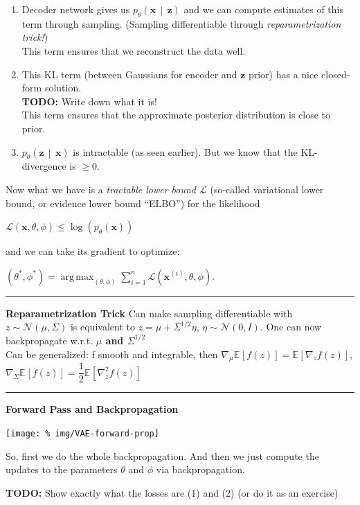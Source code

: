 \documentclass[a2paper,8pt]{extarticle}
\newcommand{\tcb}[1]{\textcolor{lighttext}{#1}}
\newcommand{\tcb}[1]{\textcolor{blue}{#1}}
\newcommand{\cL}{\mathcal{L}}
\newcommand{\cDist}[3]{#1\left( #2 \,\middle|\, #3 \right)}
\newcommand{\Exp}[2][]{{\mathbb{E}_{#1}}\left[ #2
\right]}
\DeclareMathOperator*{\argmax}{arg\,max}
\renewcommand{\vec}[1]{\mathbf{#1}}
\newcommand{\vx}{\vec{x}}
\newcommand{\vz}{\vec{z}}
\newcommand{\todo}[1]{\textbf{TODO:} #1}
\newcommand{\todo}[1]{%
}
\newcommand{\sep}{\vspace{0pt}\noindent\hrule\vspace{0pt}}
\newcommand{\sep}{\vspace{5pt}\noindent\hrule\vspace{5pt}}
\begin{document}
\begin{landscape}
\begin{multicols*}{7}
\begin{enumerate}[label=(\arabic*)]
  \item Decoder network gives us $\cDist{p_\theta}{\vx}{\vz}$ and we can compute
  estimates of this term through sampling. (Sampling differentiable through
  \emph{reparametrization trick!})\\
  This term ensures that we reconstruct the data well.
  \item This KL term (between Gaussians for encoder and $\vz$ prior) has a nice
  closed-form solution.\\
  \todo{Write down what it is!}\\
  This term ensures that the approximate posterior distribution is close to
  prior.
  \item $\cDist{p_\theta}{\vz}{\vx}$ is intractable (as seen earlier). But we
  know that the KL-divergence is $\geq 0$.
\end{enumerate}

Now what we have is a \emph{tractable lower bound $\cL$} (so-called
\tcb{variational lower bound, or evidence lower bound ``ELBO''}) for the
likelihood

$
\cL(\vx,\theta,\phi)\leq \log(p_\theta(\vx))
$

and we can take its gradient to optimize:

$
(\theta^*,\phi^*)=\argmax_{(\theta,\phi)}\sum_{i=1}^n\cL(\vx^{(i)},\theta,\phi).
$

\sep

\textbf{Reparametrization Trick}
Can make sampling differentiable with
\textbf{$z \sim \mathcal{N}(\mu, \Sigma ) $}
is equivalent to 
\textbf{$z = \mu + \Sigma ^{1/2} \eta$}, \textbf{$\eta \sim \mathcal{N} (0,I)$}.
One can now backpropagate w.r.t. \textbf{$\mu$ and $\Sigma ^{1/2}$}\\
Can be generalized: f smooth and integrable, then
$\nabla _\mu \Exp{f(z)} = \Exp{\nabla _z f(z)}$, $\nabla _\Sigma \Exp{f(z)} = \dfrac{1}{2} \Exp{\nabla ^2 _z f(z)}$

\sep

\textbf{Forward Pass and Backpropagation}

\begin{center}
  \texttt{[image: \%
img/VAE-forward-prop]}
\end{center}

So, first we do the whole backpropagation. And then we just compute the updates
to the parameters $\theta$ and $\phi$ via backpropagation.

\todo{Show exactly what the losses are (1) and (2) (or do it as an exercise)}


\end{multicols*}
\end{landscape}
\end{document}

